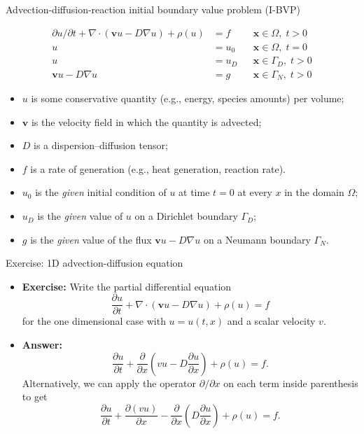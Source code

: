%
\begin{frame}[<+->]{Advection-diffusion-reaction initial boundary value problem (I-BVP)}

{\small{}\vspace{-2em}
\begin{align*}
\partial u/\partial t+\nabla\cdot(\boldsymbol{v}u-D\nabla u)  + \rho (u) & =f &  & \boldsymbol{x}\in\Omega,\;t>0\\
u & =u_{0} &  & \boldsymbol{x}\in\Omega,\;t=0\\
u & =u_{D} &  & \boldsymbol{x}\in\Gamma_{D},\;t>0\\
\boldsymbol{v}u-D\nabla u & =g &  & \boldsymbol{x}\in\Gamma_{N},\;t>0
\end{align*}
}{\small\par}
\begin{itemize}
\item $u$ is some \alert{conservative quantity} (e.g., energy, species
amounts) per volume;
\item $\boldsymbol{v}$ is the \alert{velocity field} in which the quantity is advected;
\item $D$ is a \alert{dispersion–diffusion tensor}; 
\item $f$ is a \alert{rate of generation} (e.g., heat generation, reaction
rate).
\item $u_{0}$ is the \emph{given} \alert{initial condition} of $u$ at
time $t=0$ at every $x$ in the domain $\Omega$;
\item $u_{D}$ is the \emph{given} value of $u$ on a \alert{Dirichlet boundary}
$\Gamma_{D}$;
\item $g$ is the \emph{given} value of the flux $\boldsymbol{v}u-D\nabla u$
on a \alert{Neumann boundary} $\Gamma_{N}$.
\end{itemize}
\end{frame}
%
%
\begin{frame}{Exercise: 1D advection-diffusion equation}
\begin{itemize}
\item \textbf{Exercise:} Write the partial differential equation
\[
\frac{\partial u}{\partial t}+\nabla\cdot(\boldsymbol{v}u-D\nabla u)  + \rho (u) =f
\]
for the one dimensional case with $u=u(t,x)$ and a scalar velocity $v$. 
\hiddenpause
\item \textbf{Answer:}
\[
\frac{\partial u}{\partial t}+\frac{\partial}{\partial x}\left(vu-D\frac{\partial u}{\partial x}\right)  + \rho (u) =f.
\]
Alternatively, we can apply the operator $\partial/\partial x$ on
each term inside parenthesis to get 
\[
\frac{\partial u}{\partial t}+\frac{\partial(vu)}{\partial x}-\frac{\partial}{\partial x}\left(D\frac{\partial u}{\partial x}\right)  + \rho (u) = f.
\]
\end{itemize}
\end{frame}
